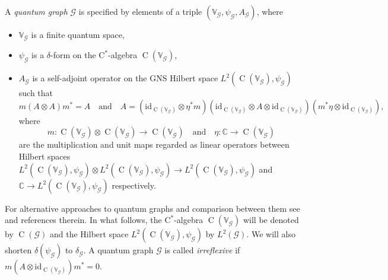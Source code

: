 \documentclass[11pt,reqno]{amsart}
\newcommand{\cst}{\ensuremath{\mathrm{C}^*}}
\newcommand{\id}{\mathrm{id}}
\newcommand{\tens}{\otimes}
\newcommand{\CC}{\mathbb{C}}
\DeclareMathOperator{\C}{C}
\begin{document}
A \emph{quantum graph} $\mathcal{G}$ is specified by elements of a triple $(\mathbb{V}_{\scriptscriptstyle\mathcal{G}},\psi_{\scriptscriptstyle\mathcal{G}},A_{\scriptscriptstyle\mathcal{G}})$, where
\begin{itemize}
\item $\mathbb{V}_{\scriptscriptstyle\mathcal{G}}$ is a finite quantum space,
\item $\psi_{\scriptscriptstyle\mathcal{G}}$ is a $\delta$-form on the \cst-algebra $\C(\mathbb{V}_{\scriptscriptstyle\mathcal{G}})$,
\item $A_{\scriptscriptstyle\mathcal{G}}$ is a self-adjoint operator on the GNS Hilbert space $L^2(\C(\mathbb{V}_{\scriptscriptstyle\mathcal{G}}),\psi_{\scriptscriptstyle\mathcal{G}})$ such that
\[
m(A\tens A)m^*=A
\quad\text{and}\quad
A=(\id_{\C(\mathbb{V}_{\scriptscriptstyle\mathcal{G}})}\tens\eta^* m)(\id_{\C(\mathbb{V}_{\scriptscriptstyle\mathcal{G}})}\tens  A\tens\id_{\C(\mathbb{V}_{\scriptscriptstyle\mathcal{G}})})(m^*\eta\tens\id_{\C(\mathbb{V}_{\scriptscriptstyle\mathcal{G}})}),
\]
where
\[
m\colon\C(\mathbb{V}_{\scriptscriptstyle\mathcal{G}})\tens\C(\mathbb{V}_{\scriptscriptstyle\mathcal{G}})\longrightarrow\C(\mathbb{V}_{\scriptscriptstyle\mathcal{G}})
\quad\text{and}\quad
\eta\colon\mathbb{C}\longrightarrow\C(\mathbb{V}_{\scriptscriptstyle\mathcal{G}})
\]
are the multiplication and unit maps regarded as linear operators between Hilbert spaces $L^2(\C(\mathbb{V}_{\scriptscriptstyle\mathcal{G}}),\psi_{\scriptscriptstyle\mathcal{G}})\tens L^2(\C(\mathbb{V}_{\scriptscriptstyle\mathcal{G}}),\psi_{\scriptscriptstyle\mathcal{G}})\to L^2(\C(\mathbb{V}_{\scriptscriptstyle\mathcal{G}}),\psi_{\scriptscriptstyle\mathcal{G}})$ and $\CC\to L^2(\C(\mathbb{V}_{\scriptscriptstyle\mathcal{G}}),\psi_{\scriptscriptstyle\mathcal{G}})$ respectively.
\end{itemize}

For alternative approaches to quantum graphs and comparison between them see \cite{Daws} and references therein. In what follows, the \cst-algebra $\C(\mathbb{V}_{\scriptscriptstyle\mathcal{G}})$ will be denoted by $\C(\mathcal{G})$ and the Hilbert space $L^2(\C(\mathbb{V}_{\scriptscriptstyle\mathcal{G}}),\psi_{\scriptscriptstyle\mathcal{G}})$ by $L^2(\mathcal{G})$. We will also shorten $\delta(\psi_{\scriptscriptstyle\mathcal{G}})$ to $\delta_{\scriptscriptstyle\mathcal{G}}$. A quantum graph $\mathcal{G}$ is called {\it irreflexive} if $m(A\otimes \id_{\C(\mathbb{V}_{\scriptscriptstyle\mathcal{G}})})m^\ast=0$.
\end{document}
